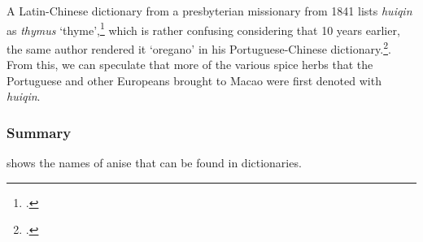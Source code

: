 A Latin-Chinese dictionary from a presbyterian missionary from 1841 lists \textit{huiqin} as \textit{thymus} `thyme',\footcite[715]{goncalves_lexicon_1841} which is rather confusing considering that 10 years earlier, the same author rendered it `oregano' in his Portuguese-Chinese dictionary.\footcite[585]{goncalves_diccionario_1831}. From this, we can speculate that more of the various spice herbs that the Portuguese and other Europeans brought to Macao were first denoted with \textit{huiqin}.





\subsubsection{Summary}

 shows the names of anise that can be found in dictionaries.


















